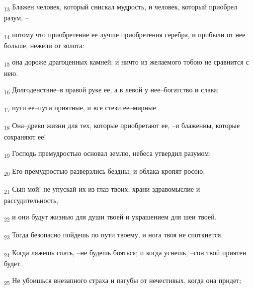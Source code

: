 \begin{tcolorbox}
\textsubscript{13} Блажен человек, который снискал мудрость, и человек, который приобрел разум, --
\end{tcolorbox}
\begin{tcolorbox}
\textsubscript{14} потому что приобретение ее лучше приобретения серебра, и прибыли от нее больше, нежели от золота:
\end{tcolorbox}
\begin{tcolorbox}
\textsubscript{15} она дороже драгоценных камней; и ничто из желаемого тобою не сравнится с нею.
\end{tcolorbox}
\begin{tcolorbox}
\textsubscript{16} Долгоденствие--в правой руке ее, а в левой у нее--богатство и слава;
\end{tcolorbox}
\begin{tcolorbox}
\textsubscript{17} пути ее--пути приятные, и все стези ее--мирные.
\end{tcolorbox}
\begin{tcolorbox}
\textsubscript{18} Она--древо жизни для тех, которые приобретают ее, --и блаженны, которые сохраняют ее!
\end{tcolorbox}
\begin{tcolorbox}
\textsubscript{19} Господь премудростью основал землю, небеса утвердил разумом;
\end{tcolorbox}
\begin{tcolorbox}
\textsubscript{20} Его премудростью разверзлись бездны, и облака кропят росою.
\end{tcolorbox}
\begin{tcolorbox}
\textsubscript{21} Сын мой! не упускай их из глаз твоих; храни здравомыслие и рассудительность,
\end{tcolorbox}
\begin{tcolorbox}
\textsubscript{22} и они будут жизнью для души твоей и украшением для шеи твоей.
\end{tcolorbox}
\begin{tcolorbox}
\textsubscript{23} Тогда безопасно пойдешь по пути твоему, и нога твоя не споткнется.
\end{tcolorbox}
\begin{tcolorbox}
\textsubscript{24} Когда ляжешь спать, --не будешь бояться; и когда уснешь, --сон твой приятен будет.
\end{tcolorbox}
\begin{tcolorbox}
\textsubscript{25} Не убоишься внезапного страха и пагубы от нечестивых, когда она придет;
\end{tcolorbox}
